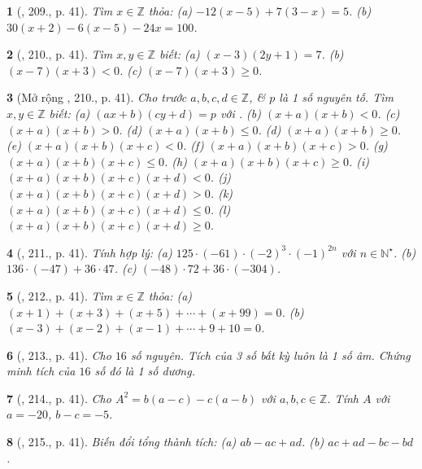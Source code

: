 \documentclass{article}
\newtheorem{baitoan}{}
\begin{document}
\begin{baitoan}[\cite{Tuyen_Toan_6}, 209., p. 41]
	Tìm $x\in\mathbb{Z}$ thỏa: (a) $-12(x - 5) + 7(3 - x) = 5$. (b) $30(x + 2) - 6(x - 5) - 24x = 100$.
\end{baitoan}

\begin{baitoan}[\cite{Tuyen_Toan_6}, 210., p. 41]
	Tìm $x,y\in\mathbb{Z}$ biết: (a) $(x - 3)(2y + 1) = 7$. (b) $(x - 7)(x + 3) < 0$. (c) $(x - 7)(x + 3)\ge0$.
\end{baitoan}

\begin{baitoan}[Mở rộng \cite{Tuyen_Toan_6}, 210., p. 41]
	Cho trước $a,b,c,d\in\mathbb{Z}$, \& $p$ là 1 số nguyên tố. Tìm $x,y\in\mathbb{Z}$ biết: (a) $(ax + b)(cy + d) = p$ với . (b) $(x + a)(x + b) < 0$. (c) $(x + a)(x + b) > 0$. (d) $(x + a)(x + b)\le0$. (d) $(x + a)(x + b)\ge0$. (e) $(x + a)(x + b)(x + c) < 0$. (f) $(x + a)(x + b)(x + c) > 0$. (g) $(x + a)(x + b)(x + c)\le0$. (h) $(x + a)(x + b)(x + c)\ge0$. (i) $(x + a)(x + b)(x + c)(x + d) < 0$. (j) $(x + a)(x + b)(x + c)(x + d) > 0$. (k) $(x + a)(x + b)(x + c)(x + d)\le0$. (l) $(x + a)(x + b)(x + c)(x + d)\ge0$.
\end{baitoan}

\begin{baitoan}[\cite{Tuyen_Toan_6}, 211., p. 41]
	Tính hợp lý: (a) $125\cdot(-61)\cdot(-2)^3\cdot(-1)^{2n}$ với $n\in\mathbb{N}^\star$. (b) $136\cdot(-47) + 36\cdot47$. (c) $(-48)\cdot72 + 36\cdot(-304)$.
\end{baitoan}

\begin{baitoan}[\cite{Tuyen_Toan_6}, 212., p. 41]
	Tìm $x\in\mathbb{Z}$ thỏa: (a) $(x + 1) + (x + 3) + (x + 5) + \cdots + (x + 99) = 0$. (b) $(x - 3) + (x - 2) + (x - 1) + \cdots + 9 + 10 = 0$.
\end{baitoan}

\begin{baitoan}[\cite{Tuyen_Toan_6}, 213., p. 41]
	Cho $16$ số nguyên. Tích của 3 số bất kỳ luôn là 1 số âm. Chứng minh tích của $16$ số đó là 1 số dương.
\end{baitoan}

\begin{baitoan}[\cite{Tuyen_Toan_6}, 214., p. 41]
	Cho $A^2 = b(a - c) - c(a - b)$ với $a,b,c\in\mathbb{Z}$. Tính $A$ với $a = -20$, $b - c = -5$.
\end{baitoan}

\begin{baitoan}[\cite{Tuyen_Toan_6}, 215., p. 41]
	Biến đổi tổng thành tích: (a) $ab - ac + ad$. (b) $ac + ad - bc - bd$.
\end{baitoan}
\end{document}
